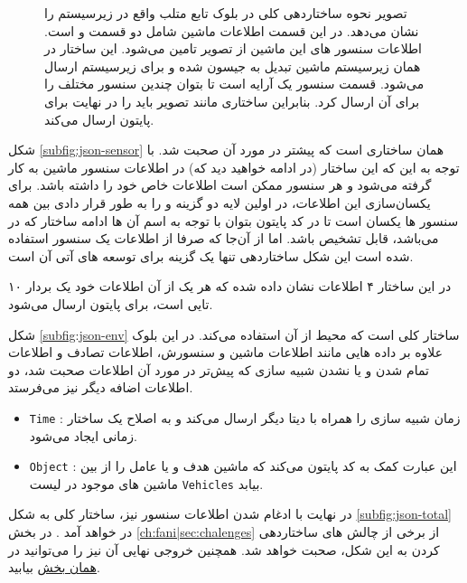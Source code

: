 \begin{figure}[h!]
{   		\label{subfig:json-total}
  	}
  	\caption[ساختار جیسون برای بلوک های سیمولینک]{%
  		تصویر
  	نحوه ساختار‌دهی کلی در بلوک تابع متلب واقع در زیرسیستم 
	را نشان می‌دهد. در این قسمت اطلاعات ماشین شامل دو قسمت  و  است. اطلاعات سنسور های این ماشین  از تصویر  تامین می‌شود. این ساختار در همان زیرسیستم ماشین تبدیل به جیسون شده و برای زیر‌سیستم  ارسال می‌شود. قسمت سنسور یک آرایه است تا بتوان چندین سنسور مختلف را برای آن ارسال کرد. بنابراین ساختاری مانند تصویر  باید را در نهایت برای پایتون ارسال می‌کند.
	\footnotemark
  	}
  	\label{fig:json-total}
\end{figure}
شکل \ref{subfig:json-sensor} همان ساختاری است که پیشتر در مورد آن صحبت شد. با توجه به این که این ساختار (در ادامه خواهید دید که) در اطلاعات سنسور ماشین به کار گرفته می‌شود و هر سنسور ممکن است اطلاعات خاص خود را داشته باشد. برای یکسان‌سازی این اطلاعات، در اولین لایه دو گزینه  و  را به طور قرار دادی بین همه سنسور ها یکسان است تا در کد پایتون بتوان با توجه به اسم آن ها ادامه ساختار که در  می‌باشد، قابل تشخیص باشد. اما از آن‌جا که صرفا از اطلاعات یک سنسور استفاده شده است این شکل ساختار‌دهی تنها یک گزینه برای توسعه های آتی آن است.

در این ساختار ۴ اطلاعات نشان داده شده که هر یک از آن اطلاعات خود یک بردار ۱۰ تایی است، برای پایتون ارسال می‌شود. 

شکل 
\ref{subfig:json-env}
ساختار کلی است که محیط  از آن استفاده می‌کند. در این بلوک علاوه بر داده هایی مانند اطلاعات ماشین و سنسورش، اطلاعات تصادف و اطلاعات تمام شدن و یا نشدن شبیه سازی که پیش‌‌تر در مورد آن اطلاعات صحبت شد، دو اطلاعات اضافه دیگر نیز می‌فرستد.
\begin{itemize}
	\item \texttt{Time} :
	زمان شبیه سازی را همراه با دیتا دیگر ارسال می‌کند و به اصلاح یک ساختار زمانی ایجاد می‌شود.
	\item \texttt{Object} :
	این عبارت کمک به کد پایتون می‌کند که ماشین هدف و یا عامل را از بین ماشین های موجود در لیست \texttt{Vehicles} بیابد. 
\end{itemize}

در نهایت با ادغام شدن اطلاعات سنسور نیز، ساختار کلی به شکل \ref{subfig:json-total} در خواهد آمد . در بخش
\ref{ch:fani|sec:chalenges}
از برخی از چالش های ساختاردهی کردن به این شکل، صحبت خواهد شد. همچنین خروجی نهایی آن نیز را می‌توانید در 
\hyperref[code:json]{همان بخش}
 بیابید.

